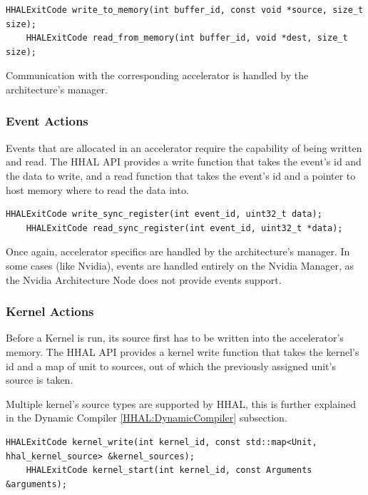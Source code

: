 \begin{lstlisting}[style=CStyle, caption=HHAL API - Buffer actions]
    HHALExitCode write_to_memory(int buffer_id, const void *source, size_t size);
    HHALExitCode read_from_memory(int buffer_id, void *dest, size_t size);
\end{lstlisting}

Communication with the corresponding accelerator is handled by the architecture's manager.

\subsubsection{Event Actions}
Events that are allocated in an accelerator require the capability of being written and read. The HHAL API provides a write function that takes the event's id and the data to write, and a read function that takes the event's id and a pointer to host memory where to read the data into.

\begin{lstlisting}[style=CStyle, caption=HHAL API - Event actions]
    HHALExitCode write_sync_register(int event_id, uint32_t data);
    HHALExitCode read_sync_register(int event_id, uint32_t *data);
\end{lstlisting}

Once again, accelerator specifics are handled by the architecture's manager. In some cases (like Nvidia), events are handled entirely on the Nvidia Manager, as the Nvidia Architecture Node does not provide events support.

\subsubsection{Kernel Actions} \label{HHAL:KernelActions}
Before a Kernel is run, its source first has to be written into the accelerator's memory. The HHAL API provides a kernel write function that takes the kernel's id and a map of unit to sources, out of which the previously assigned unit's source is taken.

Multiple kernel's source types are supported by HHAL, this is further explained in the Dynamic Compiler \ref{HHAL:DynamicCompiler} subsection.

\begin{lstlisting}[style=CStyle, caption=HHAL API - Kernel actions]
    HHALExitCode kernel_write(int kernel_id, const std::map<Unit, hhal_kernel_source> &kernel_sources);
    HHALExitCode kernel_start(int kernel_id, const Arguments &arguments);
\end{lstlisting}


